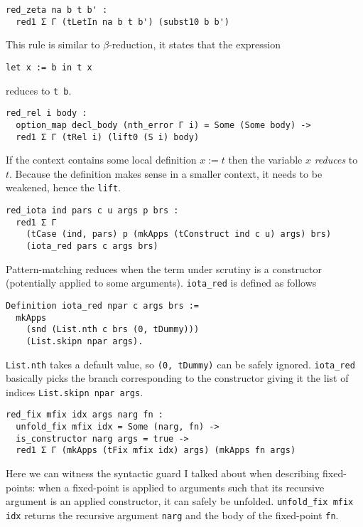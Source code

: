\begin{verbatim}
red_zeta na b t b' :
  red1 Σ Γ (tLetIn na b t b') (subst10 b b')
\end{verbatim}
This rule is similar to \(\beta\)-reduction, it states that the expression
\begin{verbatim}
let x := b in t x
\end{verbatim}
reduces to \texttt{t b}.

\begin{verbatim}
red_rel i body :
  option_map decl_body (nth_error Γ i) = Some (Some body) ->
  red1 Σ Γ (tRel i) (lift0 (S i) body)
\end{verbatim}
If the context contains some local definition \(x := t\) then the variable
\(x\) \emph{reduces} to \(t\). Because the definition makes sense in a
smaller context, it needs to be weakened, hence the \texttt{lift}.

\begin{verbatim}
red_iota ind pars c u args p brs :
  red1 Σ Γ
    (tCase (ind, pars) p (mkApps (tConstruct ind c u) args) brs)
    (iota_red pars c args brs)
\end{verbatim}
Pattern-matching reduces when the term under scrutiny is a constructor
(potentially applied to some arguments).
\texttt{iota_red} is defined as follows
\begin{verbatim}
Definition iota_red npar c args brs :=
  mkApps
    (snd (List.nth c brs (0, tDummy)))
    (List.skipn npar args).
\end{verbatim}
\texttt{List.nth} takes a default value, so
\texttt{(0, tDummy)} can be safely ignored. \texttt{iota_red}
basically picks the branch corresponding to the constructor giving it the list
of indices \texttt{List.skipn npar args}.

\begin{verbatim}
red_fix mfix idx args narg fn :
  unfold_fix mfix idx = Some (narg, fn) ->
  is_constructor narg args = true ->
  red1 Σ Γ (mkApps (tFix mfix idx) args) (mkApps fn args)
\end{verbatim}
Here we can witness the syntactic guard I talked about when describing
fixed-points: when a fixed-point is applied to arguments such that its recursive
argument is an applied constructor, it can safely be unfolded.
\texttt{unfold_fix mfix idx} returns the recursive argument
\texttt{narg} and the body of the fixed-point \texttt{fn}.

